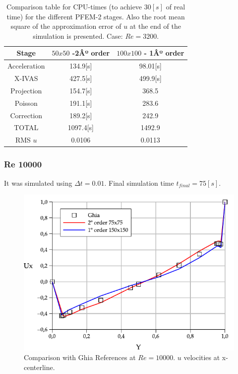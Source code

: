 \documentclass[a4paper,conference]{IEEEtran}
\begin{document}
\begin{table}[htbp]
\begin{center}
{\footnotesize
\begin{tabular}[h]{||c|c|c||}
    \hline
      Stage & $50x50$  -2Âº order & $100x100$ - 1Âº order\\
      \hline
      \hline
	Acceleration & 134.9[s]& 98.01[s]\\
	X-IVAS & 427.5[s]& 499.9[s] \\
	Projection & 154.7[s]& 368.5\\
	Poisson & 191.1[s]& 283.6\\
	Correction & 189.2[s]& 242.9\\
      \hline
	TOTAL & 1097.4[s]& 1492.9\\
      \hline
      \hline
	RMS $u$ & 0.0106 & 0.0113 \\
      \hline
      \hline
\end{tabular}
}
\caption{\label{Tabla:times_Re_3200} Comparison table for CPU-times (to achieve $30[s]$ of real time) for the different PFEM-2 stages. Also the root mean square of the approximation error of $u$ at the end of the simulation is presented. Case: $Re=3200$.}
\end{center}
\end{table}

\newpage

\subsubsection{Re 10000}


It was simulated using $\Delta t = 0.01$. Final simulation time $t_{final} = 75[s]$.

\begin{figure}[htbp]
  \begin{center}
      \includegraphics[width=.85\linewidth]{images/Re_10000_Ux.pdf}
  \end{center}
  \caption{\label{fg:Re10000} Comparison with Ghia References at $Re=10000$. $u$ velocities at x-centerline.}
\end{figure}
\end{document}
